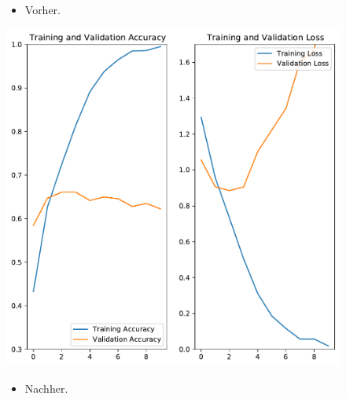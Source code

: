 \documentclass[t]{beamer}
\begin{document}
\begin{frame}
    \begin{figure}
        \begin{minipage}{0.5\textwidth}
            \begin{itemize}
                \item Vorher.
            \end{itemize}
            \includegraphics[width=\textwidth]{./teach-plots/pre_augmentation-fixed.pdf}
        \end{minipage}\hfill
        \begin{minipage}{0.5\textwidth}
            \begin{itemize}
                \item Nachher.
            \end{itemize}

\end{minipage}
\end{figure}
\end{frame}
\end{document}
